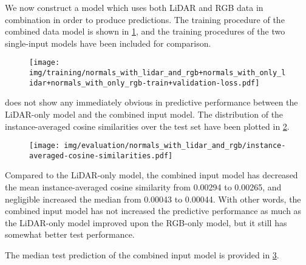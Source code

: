 We now construct a model which uses both LiDAR and RGB data in combination in order to produce predictions.
The training procedure of the combined data model is shown in \cref{fig:combined-training}, and the training procedures of the two single-input models have been included for comparison.
%
\begin{figure}[H]
  \texttt{[image: img/training/normals\_with\_lidar\_and\_rgb+normals\_with\_only\_lidar+normals\_with\_only\_rgb-train+validation-loss.pdf]}
  \label{fig:combined-training}
\end{figure}
\noindent
{} does not show any immediately obvious in predictive performance between the LiDAR-only model and the combined input model.
The distribution of the instance-averaged cosine similarities over the test set have been plotted in \cref{fig:combined-test-distribution}.
%
\begin{figure}[H]
  \texttt{[image: img/evaluation/normals\_with\_lidar\_and\_rgb/instance-averaged-cosine-similarities.pdf]}
  \label{fig:combined-test-distribution}
\end{figure}
%
Compared to the LiDAR-only model, the combined input model has decreased the mean instance-averaged cosine similarity from \num{0.00294} to \num{0.00265}, and negligible increased the median from \num{0.00043} to \num{0.00044}.
With other words, the combined input model has not increased the predictive performance as much as the LiDAR-only model improved upon the RGB-only model, but it still has somewhat better test performance.

The median test prediction of the combined input model is provided in \cref{fig:combined-median-prediction}.
%
\begin{figure}[H]
  \label{fig:combined-median-prediction}
\end{figure}

